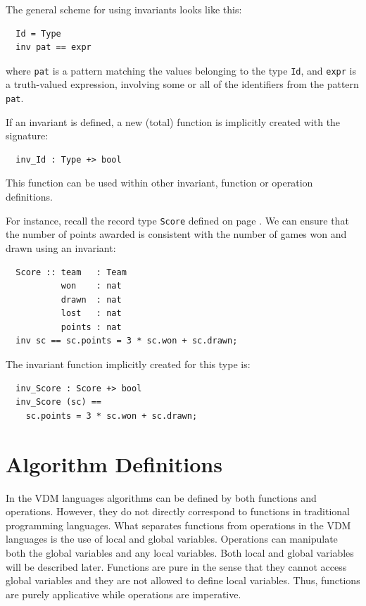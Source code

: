 \documentclass{overturerepchap}
\begin{document}
The general scheme for using invariants looks like this:

\begin{lstlisting}
  Id = Type
  inv pat == expr
\end{lstlisting}

\noindent where {\tt pat} is a pattern matching the values belonging to the type
{\tt Id}, and {\tt expr} is a truth-valued expression, involving some or
all of the identifiers from the pattern {\tt pat}.

If an invariant is defined, a new (total) function is implicitly
created with the signature:
\begin{lstlisting}
  inv_Id : Type +> bool
\end{lstlisting}
This function can be used within other invariant, function or operation
definitions.

For instance, recall the record type \texttt{Score} defined on page
\pageref{scoredef}. We can ensure that the number of points awarded
is consistent with the number of games won and drawn using an invariant:
\begin{lstlisting}
  Score :: team   : Team
           won    : nat
           drawn  : nat
           lost   : nat
           points : nat
  inv sc == sc.points = 3 * sc.won + sc.drawn;
\end{lstlisting}
The invariant function implicitly created for this type is:
\begin{lstlisting}
  inv_Score : Score +> bool
  inv_Score (sc) == 
    sc.points = 3 * sc.won + sc.drawn;
\end{lstlisting}

\chapter{Algorithm Definitions}
\label{algorithm}


In the VDM languages algorithms can be defined by both
functions and operations.  However, they do not directly correspond to
functions in traditional programming languages. What separates
functions from operations in the VDM languages is the use of
local and global variables. Operations can manipulate both the global
variables and any local variables.  Both
local and global variables will be described later. Functions are pure in
the sense that they cannot access global variables and they are not
allowed to define local variables. Thus, functions are purely
applicative while operations are imperative.
\end{document}
